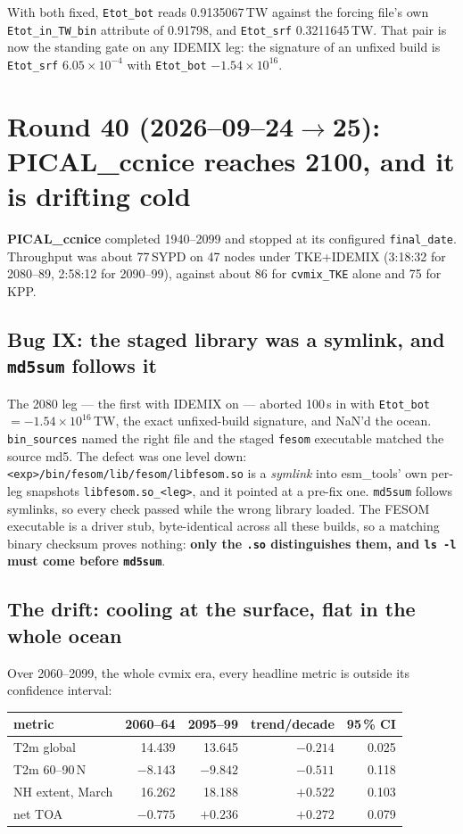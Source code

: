 \documentclass[10pt]{article}
\begin{document}
With both fixed, \texttt{Etot\_bot} reads 0.9135067\,TW against the forcing file's own
\texttt{Etot\_in\_TW\_bin} attribute of 0.91798, and \texttt{Etot\_srf} 0.3211645\,TW. That pair
is now the standing gate on any IDEMIX leg: the signature of an unfixed build is
\texttt{Etot\_srf} $6.05\times10^{-4}$ with \texttt{Etot\_bot} $-1.54\times10^{16}$.

\section{Round 40 (2026--09--24$\to$25): PICAL\_ccnice reaches 2100, and it is drifting cold}\label{sec:round40}

\textbf{PICAL\_ccnice} completed 1940--2099 and stopped at its configured \texttt{final\_date}.
Throughput was about 77\,SYPD on 47 nodes under TKE+IDEMIX (3:18:32 for 2080--89, 2:58:12 for
2090--99), against about 86 for \texttt{cvmix\_TKE} alone and 75 for KPP.

\subsection{Bug IX: the staged library was a symlink, and \texttt{md5sum} follows it}\label{sub:r40albedo}

The 2080 leg --- the first with IDEMIX on --- aborted 100\,s in with
\texttt{Etot\_bot} $=-1.54\times10^{16}$\,TW, the exact unfixed-build signature, and NaN'd the
ocean. \texttt{bin\_sources} named the right file and the staged \texttt{fesom} executable
matched the source md5. The defect was one level down:
\texttt{<exp>/bin/fesom/lib/fesom/libfesom.so} is a \emph{symlink} into esm\_tools' own per-leg
snapshots \texttt{libfesom.so\_<leg>}, and it pointed at a pre-fix one. \texttt{md5sum} follows
symlinks, so every check passed while the wrong library loaded. The FESOM executable is a driver
stub, byte-identical across all these builds, so a matching binary checksum proves nothing:
\textbf{only the \texttt{.so} distinguishes them, and \texttt{ls -l} must come before
\texttt{md5sum}}.

\subsection{The drift: cooling at the surface, flat in the whole ocean}\label{sub:r40drift}

Over 2060--2099, the whole cvmix era, every headline metric is outside its confidence interval:

\begin{center}
\begin{tabular}{lrrrr}
\hline
metric & 2060--64 & 2095--99 & trend/decade & 95\,\% CI \\
\hline
T2m global        & 14.439 & 13.645 & $-0.214$ & 0.025 \\
T2m 60--90\,N     & $-8.143$ & $-9.842$ & $-0.511$ & 0.118 \\
NH extent, March  & 16.262 & 18.188 & $+0.522$ & 0.103 \\
net TOA           & $-0.775$ & $+0.236$ & $+0.272$ & 0.079 \\
\hline
\end{tabular}
\end{center}
\end{document}
